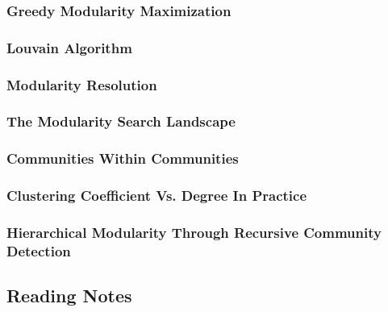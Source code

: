 \documentclass[11pt]{scrartcl} %
\begin{document}
\subsubsection{Greedy Modularity Maximization}
\subsubsection{Louvain Algorithm}
\subsubsection{Modularity Resolution}
\subsubsection{The Modularity Search Landscape}
\subsubsection{Communities Within Communities}
\subsubsection{Clustering Coefficient Vs. Degree In Practice}
\subsubsection{Hierarchical Modularity Through Recursive Community Detection}




\subsubsection{}
\subsubsection{}
\subsubsection{}
\subsubsection{}
\subsubsection{}



\subsection{Reading Notes}
\end{document}
